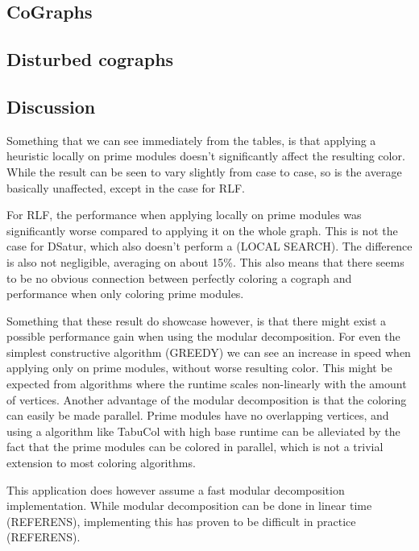 \documentclass{amsart}
\begin{document}
\subsection{CoGraphs}

\subsection{Disturbed cographs}



\subsection{Discussion}

Something that we can see immediately from the tables, is that applying a
heuristic locally on prime modules doesn't significantly affect the resulting
color. While the result can be seen to vary slightly from case to case, so is
the average basically unaffected, except in the case for RLF.

For RLF, the performance when applying locally on prime modules was
significantly worse compared to applying it on the whole graph. This is not the
case for DSatur, which also doesn't perform a (LOCAL SEARCH). The difference is
also not negligible, averaging on about 15\%.  This also means that there seems
to be no obvious connection between perfectly coloring a cograph and
performance when only coloring prime modules. 

Something that these result do showcase however, is that there might exist a
possible performance gain when using the modular decomposition. For even the
simplest constructive algorithm (GREEDY) we can see an increase in speed when
applying only on prime modules, without worse resulting color. This might be
expected from algorithms where the runtime scales non-linearly with the amount
of vertices. Another advantage of the modular decomposition is that the
coloring can easily be made parallel. Prime modules have no overlapping
vertices, and using a algorithm like TabuCol with high base runtime can be
alleviated by the fact that the prime modules can be colored in parallel, which
is not a trivial extension to most coloring algorithms.

This application does however assume a fast modular decomposition implementation.
While modular decomposition can be done in linear time (REFERENS), implementing
this has proven to be difficult in practice (REFERENS).

\printbibliography
\end{document}
